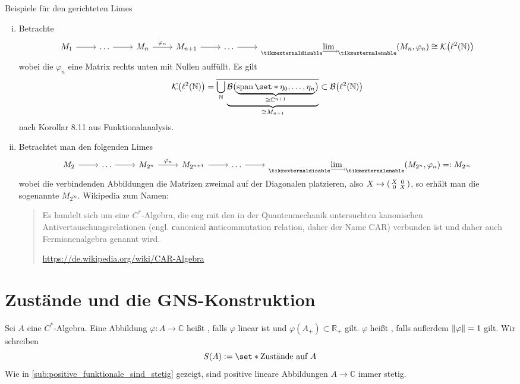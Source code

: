 \begin{beispiel}[{name=[gerichtete Limites von $C^*$-Algebren]}]
	Beispiele für den gerichteten Limes
	\begin{enumerate}[(i)]
		\item Betrachte
		\[
			\begin{tikzcd}
				M_1 \rar & \ldots  \rar & M_n \rar["\varphi_n"] & M_{n+1} \rar & \ldots \rar & \displaystyle\Dlim (M_n,\varphi_n) \cong \mathcal{K} \enbrace*{\ell^2(\mathbb{N})}
			\end{tikzcd}
		\]
		wobei die $\varphi_n$ eine Matrix rechts unten mit Nullen auffüllt. Es gilt
		\[
			\mathcal{K} \enbrace*{\ell^2(\mathbb{N})} = \overline{\bigcup_\mathbb{N} \Underbrace{\mathcal{B} \enbrace[\big]{\Underbrace{\Span \set*{\eta_0, \ldots , \eta_n}}{\cong \mathbb{C}^{n+1}}}}{\cong M_{n+1}}} \subset \mathcal{B} \enbrace*{\ell^2(\mathbb{N})}
		\]
		nach Korollar 8.11 aus Funktionalanalysis.
		\item Betrachtet man den folgenden Limes
		\[
			\begin{tikzcd}
				M_2 \rar & \ldots  \rar & M_{2^n} \rar["\varphi_n"] & M_{2^{n+1}} \rar & \ldots \rar & \displaystyle\Dlim (M_{2^n},\varphi_n) =: M_{2^\infty}
			\end{tikzcd}
		\]
		wobei die verbindenden Abbildungen die Matrizen zweimal auf der Diagonalen platzieren, also $X \mapsto \begin{psmallmatrix}
			X & 0 \\
			0 & X 
		\end{psmallmatrix}$, so erhält man die sogenannte  $M_{2^\infty}$. 
		Wikipedia zum Namen:
		
		\blockquote[\url{https://de.wikipedia.org/wiki/CAR-Algebra}]{Es handelt sich um eine $C^*$-Algebra, die eng mit den in der Quantenmechanik untersuchten kanonischen Antivertauschungsrelationen (engl. \textbf{c}anonical \textbf{a}nticommutation \textbf{r}elation, daher der Name CAR) verbunden ist und daher auch Fermionenalgebra genannt wird.}
	\end{enumerate}
\end{beispiel}
\newpage

\section{Zustände und die GNS-Konstruktion} %
\label{sec:5}

\begin{definition}[{name=[positive Funktionale und Zustände]},label=def:51]
	Sei $A$ eine $C^*$-Algebra. 
	Eine Abbildung $\varphi \colon A \to \mathbb{C}$ heißt , falls $\varphi$ linear ist und $\varphi(A_+) \subset \mathbb{R}_+$ gilt. 
	$\varphi$ heißt , falls außerdem $\norm*{\varphi}= 1$ gilt. 
	Wir schreiben 
	\[
		S(A) := \set*{\text{Zustände auf }A}
	\]
	Wie in \cref{sub:positive_funktionale_sind_stetig} gezeigt, sind positive lineare Abbildungen $A \to \mathbb{C}$ immer stetig.
\end{definition}

